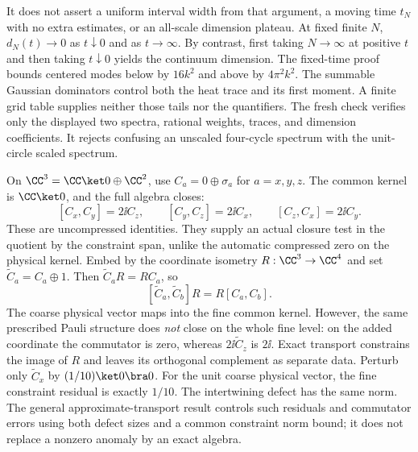 It does not assert a uniform interval width from that argument, a moving time $t_N$ with no extra estimates, or an all-scale dimension plateau. At fixed finite $N$, $d_N(t)\to0$ as $t\downarrow0$ and as $t\to\infty$. By contrast, first taking $N\to\infty$ at positive $t$ and then taking $t\downarrow0$ yields the continuum dimension.
The fixed-time proof bounds centered modes below by $16k^2$ and above by $4\pi^2k^2$. The summable Gaussian dominators control both the heat trace and its first moment. A finite grid table supplies neither those tails nor the quantifiers. The fresh check verifies only the displayed two spectra, rational weights, traces, and dimension coefficients. It rejects confusing an unscaled four-cycle spectrum with the unit-circle scaled spectrum.

On $\CC^3=\CC\ket0\oplus\CC^2$, use $C_a=0\oplus\sigma_a$ for $a=x,y,z$. The common kernel is $\CC\ket0$, and the full algebra closes:
\[
[C_x,C_y]=2\ii C_z,\qquad[C_y,C_z]=2\ii C_x,\qquad[C_z,C_x]=2\ii C_y.
\]
These are uncompressed identities. They supply an actual closure test in the quotient by the constraint span, unlike the automatic compressed zero on the physical kernel.
Embed by the coordinate isometry $R:\CC^3\to\CC^4$ and set $\widetilde C_a=C_a\oplus1$. Then $\widetilde C_aR=RC_a$, so
\[
[\widetilde C_a,\widetilde C_b]R=R[C_a,C_b].
\]
The coarse physical vector maps into the fine common kernel. However, the same prescribed Pauli structure does \emph{not} close on the whole fine level: on the added coordinate the commutator is zero, whereas $2\ii\widetilde C_z$ is $2\ii$. Exact transport constrains the image of $R$ and leaves its orthogonal complement as separate data.
Perturb only $\widetilde C_x$ by $(1/10)\ket0\bra0$. For the unit coarse physical vector, the fine constraint residual is exactly $1/10$. The intertwining defect has the same norm. The general approximate-transport result controls such residuals and commutator errors using both defect sizes and a common constraint norm bound; it does not replace a nonzero anomaly by an exact algebra.

